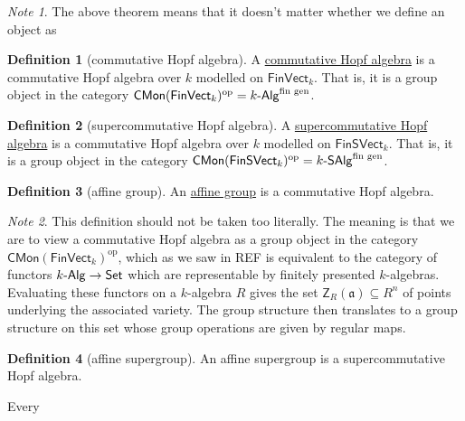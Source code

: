\documentclass[a4paper,10pt]{scrreprt}
\newcommand{\defn}[1]{\ul{#1}}
\def\mhyp{{\hbox{-}}}
\theoremstyle{definition}
\newtheorem{definition}{Definition}[section]
\theoremstyle{plain}
\theoremstyle{remark}
\newtheorem{note}{Note}[section]
\begin{document}
\begin{note}
  The above theorem means that it doesn't matter whether we define an object as
\end{note}

\begin{definition}[commutative Hopf algebra]
  \label{def:commutativehopfalgebra}
  A \defn{commutative Hopf algebra} is a commutative Hopf algebra over $k$ modelled on $\mathsf{FinVect}_{k}$. That is, it is a group object in the category $\mathsf{CMon}(\mathsf{FinVect}_{k})^{\mathrm{op}} = k\mhyp\mathsf{Alg}^{\text{fin gen}}$.
\end{definition}

\begin{definition}[supercommutative Hopf algebra]
  \label{def:supercommutativehopfalgebra}
  A \defn{supercommutative Hopf algebra} is a commutative Hopf algebra over $k$ modelled on $\mathsf{FinSVect}_{k}$. That is, it is a group object in the category $\mathsf{CMon}(\mathsf{FinSVect}_{k})^{\mathrm{op}} = k\mhyp\mathsf{SAlg}^{\text{fin gen}}$.
\end{definition}

\begin{definition}[affine group]
  \label{def:affinegroup}
  An \defn{affine group} is a commutative Hopf algebra.
\end{definition}

\begin{note}
  This definition should not be taken too literally. The meaning is that we are to view a commutative Hopf algebra as a group object in the category $\mathsf{CMon}(\mathsf{FinVect}_{k})^{\mathrm{op}}$, which as we saw in REF is equivalent to the category of functors $k\mhyp\mathsf{Alg} \to \mathsf{Set}$ which are representable by finitely presented $k$-algebras. Evaluating these functors on a $k$-algebra $R$ gives the set $\mathsf{Z}_{R}(\mathfrak{a}) \subseteq R^{n}$ of points underlying the associated variety. The group structure then translates to a group structure on this set whose group operations are given by regular maps.
\end{note}

\begin{definition}[affine supergroup]
  \label{def:affinesupergroup}
  An affine supergroup is a supercommutative Hopf algebra.
\end{definition}



Every 
\end{document}
